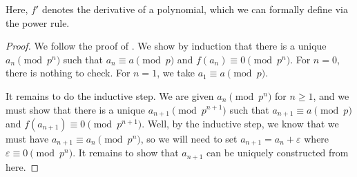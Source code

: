 \documentclass[../notes.tex]{subfiles}
\begin{document}
Here, $f'$ denotes the derivative of a polynomial, which we can formally define via the power rule.
\begin{proof}
	We follow the proof of . We show by induction that there is a unique $a_n\pmod{p^n}$ such that $a_n\equiv a\pmod p$ and $f(a_n)\equiv0\pmod{p^n}$. For $n=0$, there is nothing to check. For $n=1$, we take $a_1\equiv a\pmod p$.

	It remains to do the inductive step. We are given $a_n\pmod{p^n}$ for $n\ge1$, and we must show that there is a unique $a_{n+1}\pmod{p^{n+1}}$ such that $a_{n+1}\equiv a\pmod p$ and $f(a_{n+1})\equiv0\pmod{p^{n+1}}$. Well, by the inductive step, we know that we must have $a_{n+1}\equiv a_n\pmod{p^n}$, so we will need to set $a_{n+1}=a_n+\varepsilon$ where $\varepsilon\equiv0\pmod{p^n}$. It remains to show that $a_{n+1}$ can be uniquely constructed from here.
	

\end{proof}
\end{document}
